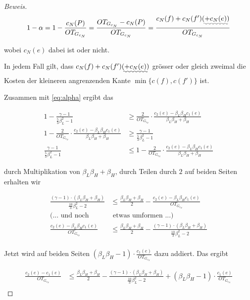 \documentclass[a4paper,11pt]{scrreprt}
\begin{document}
\begin{proof}[Beweis]
\begin{align*}
1 - \alpha = 1 - \frac{c_N(P)}{OT_{G_{c_N}}} = \frac{OT_{G_{c_N}} - c_N(P)}{OT_{G_{c_N}}} = \frac{c_N(f) + c_N(f') \uwave{(+ c_N(e))}}{OT_{G_{c_N}}}
\end{align*}

wobei $c_N(e)$ dabei ist oder nicht.

In jedem Fall gilt, dass $c_N(f) + c_N(f') \uwave{(+ c_N(e))}$ grösser oder gleich zweimal die Kosten der kleineren angrenzenden Kante $\min\{c(f), c(f')\}$ ist.

Zusammen mit \ref{eq:alpha} ergibt das

\begin{align*}
1 - \frac{\gamma - 1}{\frac{5}{3}\beta_L^2 - 1} &\ge \frac{2}{OT_{G_{c_N}}} \cdot \frac{c_2(e) - \beta_L\beta_H c_1(e)}{\beta_L\beta_H + \beta_H} \\
1 - \frac{2}{OT_{G_{c_N}}} \cdot \frac{c_2(e) - \beta_L\beta_H c_1(e)}{\beta_L\beta_H + \beta_H} &\ge \frac{\gamma - 1}{\frac{5}{3}\beta_L^2 - 1} \\
\frac{\gamma - 1}{\frac{5}{3}\beta_L^2 - 1} &\le 1 - \frac{2}{OT_{G_{c_N}}} \cdot \frac{c_2(e) - \beta_L\beta_H c_1(e)}{\beta_L\beta_H + \beta_H} 
\end{align*}

durch Multiplikation von $\beta_L\beta_H + \beta_H$, durch Teilen durch $2$ auf beiden Seiten erhalten wir

\begin{align*}
\frac{(\gamma - 1)\cdot(\beta_L\beta_H + \beta_H)}{\frac{10}{3}\beta_L^2 - 2} &\le \frac{\beta_L\beta_H + \beta_H}{2} - \frac{c_2(e) - \beta_L\beta_H c_1(e)}{OT_{G_{c_N}}}\\
(\text{... und noch}&\text{ etwas umformen ...})\\
\frac{c_2(e) - \beta_L\beta_H c_1(e)}{OT_{G_{c_N}}} &\le \frac{\beta_L\beta_H + \beta_H}{2} - \frac{(\gamma - 1)\cdot(\beta_L\beta_H + \beta_H)}{\frac{10}{3}\beta_L^2 - 2}\\
\end{align*}

Jetzt wird auf beiden Seiten $(\beta_L\beta_H - 1) \cdot  \frac{c_1(e)}{OT_{G_{c_N}}}$ dazu addiert. Das ergibt

\begin{align*}
\frac{c_2(e) - c_1(e)}{OT_{G_{c_N}}} &\le \frac{\beta_L\beta_H + \beta_H}{2} - \frac{(\gamma - 1)\cdot(\beta_L\beta_H + \beta_H)}{\frac{10}{3}\beta_L^2 - 2} + (\beta_L\beta_H - 1) \cdot \frac{c_1(e)}{OT_{G_{c_N}}}\\
\end{align*}


\end{proof}
\end{document}
